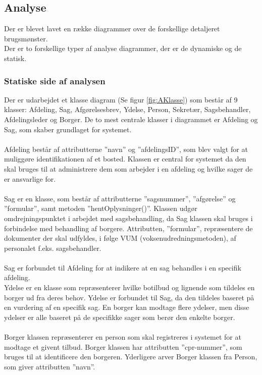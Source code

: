 \subsection{Analyse}
Der er blevet lavet en række diagrammer over de forskellige detaljeret brugsmønster.\\
Der er to forskellige typer af analyse diagrammer, der er de dynamiske og de statisk.

\subsubsection{Statiske side af analysen}
Der er udarbejdet et klasse diagram (Se figur \ref{fig:AKlasse}) som består af 9 klasser: Afdeling, Sag, Afgørelsesbrev, Ydelse, Person, Sekretær, Sagsbehandler, Afdelingsleder og Borger. De to mest centrale klasser i diagrammet er Afdeling og Sag, som skaber grundlaget for systemet. \\ \\
Afdeling består af attributterne ”navn” og ”afdelingsID”, som blev valgt for at muliggøre identifikationen af et bosted. Klassen er central for systemet da den skal bruges til at administrere dem som arbejder i en afdeling og hvilke sager de er ansvarlige for. \\ \\
Sag er en klasse, som består af attributterne ”sagsnummer”, ”afgørelse” og ”formular”, samt metoden ”hentOplysninger()”. Klassen udgør omdrejningspunktet i arbejdet med sagsbehandling, da Sag klassen skal bruges i forbindelse med behandling af borgere. Attributten, ”formular”, repræsentere de dokumenter der skal udfyldes, i følge VUM (voksenudredningsmetoden), af personalet f.eks. sagsbehandler. \\ \\
Sag er forbundet til Afdeling for at indikere at en sag behandles i en specifik afdeling.\\
Ydelse er en klasse som repræsenterer hvilke botilbud og lignende som tildeles en borger ud fra deres behov. Ydelse er forbundet til Sag, da den tildeles baseret på en vurdering af en specifik sag. En borger kan modtage flere ydelser, men disse ydelser er alle baseret på de specifikke sager som berør den enkelte borger.\\ \\
Borger klassen repræsenterer en person som skal registreres i systemet for at modtage et givent tilbud. Borger klassen har attributten ”cpr-nummer”, som bruges til at identificere den borgeren. Yderligere arver Borger klassen fra Person, som giver attributten ”navn”.\\ \\
